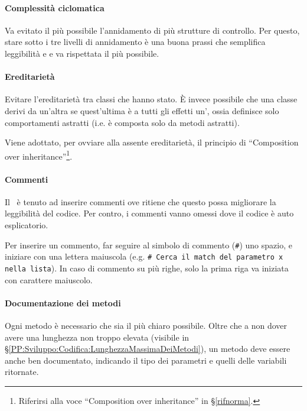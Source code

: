         \paragraph{Complessità ciclomatica}\label{PP:Sviluppo:Codifica:ComplessitàCiclomatica}
		Va evitato il più possibile l'annidamento di più strutture di controllo. Per questo, stare sotto i tre livelli di annidamento è una buona
		prassi che semplifica leggibilità e  e va rispettata il più possibile.


		\paragraph{Ereditarietà}\label{PP:Sviluppo:Codifica:Ereditarietà}
		Evitare l'ereditarietà tra classi che hanno stato. È invece possibile che una classe derivi da un'altra se quest'ultima è a tutti gli
		effetti un', ossia definisce solo comportamenti astratti (i.e. è composta solo da metodi astratti).\par
		Viene adottato, per ovviare alla assente ereditarietà, il principio di ``Composition over inheritance''\footnote{Riferirsi alla voce %
		``Composition over inheritance'' in \S\ref{rifnorma}.}. 


        \paragraph{Commenti}\label{PP:Sviluppo:Codifica:Commenti}
		Il \Progr\ è tenuto ad inserire commenti ove ritiene che questo possa migliorare la leggibilità del codice. Per contro, i commenti vanno
		omessi dove il codice è auto esplicatorio.\par
		Per inserire un commento, far seguire al simbolo di commento (\texttt{\#}) uno spazio, e iniziare con una lettera maiuscola (e.g.
		\texttt{\#\ Cerca il match del parametro x nella lista}). In caso di commento su più righe, solo la prima riga va iniziata con carattere
		maiuscolo.
        
        \paragraph{Documentazione dei metodi}\label{PP:Sviluppo:Codifica:DocumentazioneDeiMetodi}
        Ogni metodo è necessario che sia il più chiaro possibile. Oltre che a non dover avere una lunghezza non troppo elevata (visibile in \S\ref{PP:Sviluppo:Codifica:LunghezzaMassimaDeiMetodi}), un metodo deve essere anche ben documentato, indicando il tipo dei parametri e quelli delle variabili ritornate.
        

